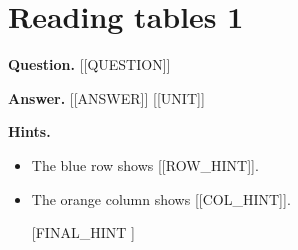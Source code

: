 \documentclass{article}
\begin{document}
\section*{Reading tables 1}
\textbf{Question.} [[QUESTION]]

\textbf{Answer.} [[ANSWER]] [[UNIT]]

\textbf{Hints.}
\begin{itemize}
  \item The blue row shows [[ROW\_HINT]].
  \item The orange column shows [[COL\_HINT]].
  \item [[FINAL\_HINT]]
\end{itemize}
\end{document}
